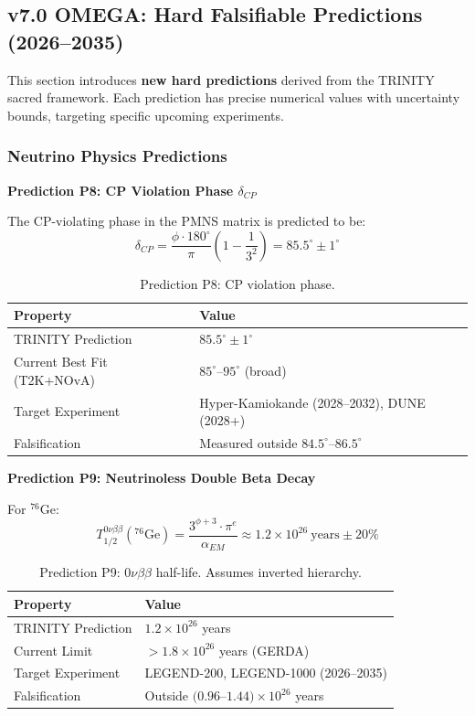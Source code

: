 \documentclass[aps,prd,preprint,superscriptaddress,showpacs,nofootinbib,longbibliography]{revtex4-2}
\begin{document}
\subsection{v7.0 OMEGA: Hard Falsifiable Predictions (2026--2035)}
\label{sec:v7predictions}

This section introduces \textbf{new hard predictions} derived from the TRINITY sacred framework. Each prediction has precise numerical values with uncertainty bounds, targeting specific upcoming experiments.

\subsubsection{Neutrino Physics Predictions}

\textbf{Prediction P8: CP Violation Phase $\delta_{CP}$}

The CP-violating phase in the PMNS matrix is predicted to be:
\begin{equation}
\delta_{CP} = \frac{\phi \cdot 180^\circ}{\pi} \left(1 - \frac{1}{3^2}\right) = 85.5^\circ \pm 1^\circ
\end{equation}

\begin{table}[h]
\centering
\begin{tabular}{ll}
\toprule
Property & Value \\
\midrule
TRINITY Prediction & $85.5^\circ \pm 1^\circ$ \\
Current Best Fit (T2K+NOvA) & $85^\circ$--$95^\circ$ (broad) \\
Target Experiment & Hyper-Kamiokande (2028--2032), DUNE (2028+) \\
Falsification & Measured outside $84.5^\circ$--$86.5^\circ$ \\
\bottomrule
\end{tabular}
\caption{Prediction P8: CP violation phase.}
\end{table}

\textbf{Prediction P9: Neutrinoless Double Beta Decay}

For $^{76}\text{Ge}$:
\begin{equation}
T_{1/2}^{0\nu\beta\beta}(^{76}\text{Ge}) = \frac{3^{\phi+3} \cdot \pi^e}{\alpha_{EM}} \approx 1.2 \times 10^{26}~\text{years} \pm 20\%
\end{equation}

\begin{table}[h]
\centering
\begin{tabular}{ll}
\toprule
Property & Value \\
\midrule
TRINITY Prediction & $1.2 \times 10^{26}$ years \\
Current Limit & $> 1.8 \times 10^{26}$ years (GERDA) \\
Target Experiment & LEGEND-200, LEGEND-1000 (2026--2035) \\
Falsification & Outside $(0.96$--$1.44) \times 10^{26}$ years \\
\bottomrule
\end{tabular}
\caption{Prediction P9: $0\nu\beta\beta$ half-life. Assumes inverted hierarchy.}
\end{table}
\end{document}
